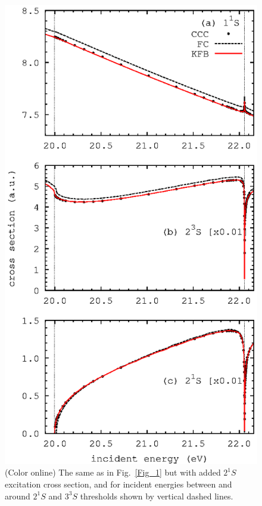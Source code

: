 \documentclass[aip
, pra
, showpacs
, aps
, twocolumn
, groupedaddress
, floatfix
]{revtex4}
\begin{document}
\begin{figure}[htb]
\includegraphics[scale=1]{fig2.ps}
\caption{(Color online) The same as in Fig.~\ref{Fig_1} but with added $2^1S$ excitation cross section, and 
for incident energies between and around $2^1S$ and $3^3S$ thresholds shown by vertical dashed lines.
}
\label{Fig_2}
\end{figure}
\end{document}
